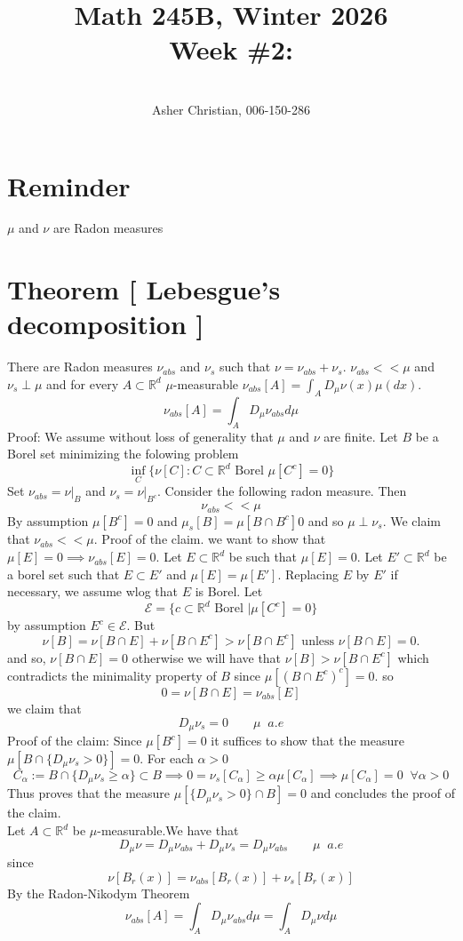 \documentclass[11pt]{article}
\newcommand{\cnum}{Math 245B}
\newcommand{\ced}{Winter 2026}
\newcommand{\ctitle}[4]{\title{\vspace{-0.5in}\cnum, \ced\\Week #1: #2}\author{\vspace{-0.35in}\\#3, #4}}
\begin{document}
\ctitle{\#2}{}{Asher Christian}{006-150-286}
\date{}
\maketitle
\section{Reminder}
$\mu$ and $\nu$ are Radon measures
\section{Theorem [ Lebesgue's decomposition ] } There are Radon measures  $\nu_{abs}$ and  $\nu_s$ such that  $\nu = \nu_{abs} + \nu_s$.
$\nu_{abs} << \mu$ and $\nu_s \perp \mu$ and for every $A \subset \mathbb{R}^{d}$ $\mu$-measurable $\nu_{abs}[A] = \int_{A}^{}D_\mu \nu(x) \mu(dx)$.
\[
    \nu_{abs}[A] = \int_{A}^{} D_\mu \nu_{abs} d \mu
\] 
Proof: We assume without loss of generality that $\mu$ and $\nu$ are finite. Let $B$ be a Borel set minimizing the folowing problem
 \[
     \inf_{C}\{\nu[C] : C \subset \mathbb{R}^{d} \text{ Borel } \mu[C^{c}] = 0\}
\] 
Set $\nu_{abs} = \nu|_B$ and $\nu_s = \nu|_{B^{c}}$. Consider the following radon measure. Then 
\[
    \nu_{abs} << \mu
\] 
By assumption $\mu[B^{c}] = 0$ and $\mu_s[B] = \mu[B \cap B^{c} ] 0$ and so $\mu \perp \nu_s$.
We claim that $\nu_{abs} << \mu$. Proof of the claim. we want to show that $\mu[E] = 0 \implies \nu_{abs}[E] = 0$.
Let $E \subset \mathbb{R}^{d}$ be such that $\mu[E] = 0$. Let $E' \subset \mathbb{R}^{d}$ be a borel set such that $E \subset E'$ and $\mu[E] = \mu[E']$. Replacing $E$ by $E'$ if necessary,
we assume wlog that  $E$ is Borel. Let
\[
    \mathcal{E} = \{c \subset \mathbb{R}^{d} \text{ Borel } | \mu[C^{c}] = 0\}
\] 
by assumption $E^{c} \in \mathcal{E}$. But
\[
    \nu[B] = \nu[B \cap E] + \nu[B \cap E^{c}] > \nu[B \cap E^{c}] \text{ unless $\nu[B \cap E] = 0$.}
\] 
and so, $\nu[B \cap E] = 0$ otherwise we will have that  $\nu[B] > \nu[B \cap E^{c}] $ which contradicts the minimality property of $B$ since $\mu[(B\cap E^{c})^{c}] = 0$. so
\[
    0 = \nu[B \cap E] = \nu_{abs}[E]
\] 
we claim that
\[
D_\mu \nu_s = 0 \qquad \mu \;\; a.e
\] 
Proof of the claim: Since $\mu[B^{c}] = 0$ it suffices to show that the measure $\mu[B \cap \{D_\mu \nu_s > 0\}] = 0$. For each $\alpha > 0$
\[
    C_\alpha := B \cap \{D_\mu \nu_s \ge \alpha\} \subset B \implies 0 = \nu_s[C_\alpha] \ge \alpha \mu[C_\alpha] \implies \mu[C_\alpha] = 0  \;\; \forall \alpha > 0
\] 
Thus proves that the measure $\mu[\{D_\mu \nu_s > 0\} \cap B] = 0$ and concludes the proof of the claim.\\
Let $A \subset \mathbb{R}^{d}$ be $\mu $-measurable.We have that 
\[
    D_\mu\nu = D_\mu \nu_{abs} + D_\mu \nu_s = D_\mu \nu_{abs} \qquad \mu \;\; a.e
\] 
since
\[
    \nu[B_r(x)] = \nu_{abs}[B_r(x)] + \nu_s[B_r(x)]
\] 
By the Radon-Nikodym Theorem
\[
    \nu_{abs}[A] = \int_{A}^{} D_\mu \nu_{abs} d \mu = \int_{A}^{}D_\mu \nu d \mu
\] 
\end{document}
